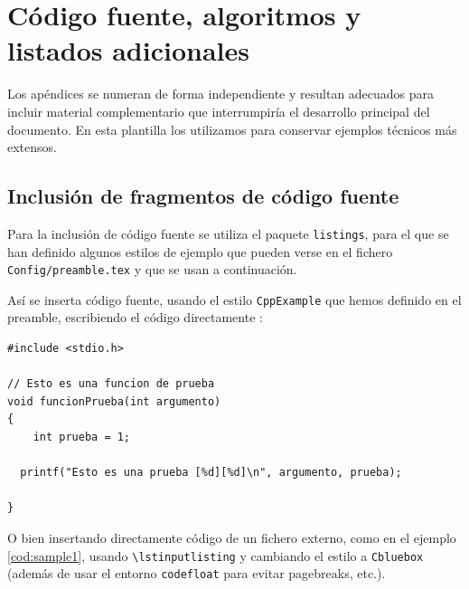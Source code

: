 %

\chapter{Código fuente, algoritmos y listados adicionales}
\label{cha:codigo-algoritmos-listados}

Los apéndices se numeran de forma independiente y resultan adecuados para incluir material complementario que interrumpiría el desarrollo principal del documento. En esta plantilla los utilizamos para conservar ejemplos técnicos más extensos.

\section{Inclusión de fragmentos de código fuente}
\label{sec:codigo-fuente}

Para la inclusión de código fuente se utiliza el paquete
\texttt{listings}, para el que se han definido algunos estilos de
ejemplo que pueden verse en el fichero \texttt{Config/preamble.tex} y
que se usan a continuación.

Así se inserta código fuente, usando el estilo \texttt{CppExample} que
hemos definido en el preamble, escribiendo el código directamente :

\begin{lstlisting}[style=CppExample]
#include <stdio.h>

// Esto es una funcion de prueba
void funcionPrueba(int argumento)
{	
	int prueba = 1;

  printf("Esto es una prueba [%d][%d]\n", argumento, prueba);

}
\end{lstlisting}

O bien insertando directamente código de un fichero externo, como en el
ejemplo \ref{cod:sample1}, usando
\texttt{\textbackslash{}lstinputlisting} y cambiando el estilo a
\texttt{Cbluebox} (además de usar el entorno \texttt{codefloat} para
evitar pagebreaks, etc.).

